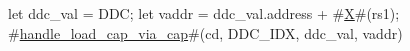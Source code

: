 let ddc_val = DDC;
let vaddr = ddc_val.address + #\hyperref[sailRISCVzX]{X}#(rs1);
#\hyperref[sailRISCVzhandlezyloadzycapzyviazycap]{handle\_load\_cap\_via\_cap}#(cd, DDC_IDX, ddc_val, vaddr)
